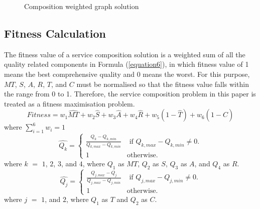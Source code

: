 \documentclass{llncs}
\begin{document}
\begin{figure}[h]
\centering
{}
 \caption{Composition weighted graph solution}
 \label{wscs}
\end{figure}

\vspace{-1cm}
\subsection{Fitness Calculation}
The fitness value of a service composition solution is a weighted sum of all the quality related components in Formula (\ref{equation6}), in which fitness value of 1 means the best comprehensive quality and 0 means the worst. For this purpose, $MT$, $S$, $A$, $R$, $T$, and $C$ must be normalised so that the fitness value falls within the range from 0 to 1. Therefore, the service composition problem in this paper is treated as a fitness maximisation problem.
\vspace{-0.2cm}
\begin{equation}
\label{equation6}
Fitness = w_1 \hat{MT} + w_2 \hat{S} + w_3 \hat{A} + w_4 \hat{R} + w_5(1 - \hat{T}) + w_6(1 - \hat{C})
\end{equation}
\noindent where $\sum_{i=1}^{6} w_i = 1$
\\
\vspace{-0.2cm}
\begin{equation}
\label{equation7}
\hat{Q_k} = 
\begin{cases}
	\frac{Q_k - Q_{k, min}}{Q_{k, max} - Q_{k, min}} & \text{ if }Q_{k, max} - Q_{k, min} \neq 0.\\
	1 & \mathrm{ otherwise}.
\end{cases}
\end{equation}
\noindent where $k$ $=$ $1$, $2$, $3$, and $4$, where $Q_1$ as $MT$, $Q_2$ as $S$, $Q_3$ as $A$, and $Q_4$ as $R$.
\begin{equation}
\label{equation8}
\hat{Q_j} = 
\begin{cases}
	\frac{Q_{j,max} - Q_j}{Q_{j, max} - Q_{j, min}} & \text{ if }Q_{j, max} - Q_{j, min} \neq 0.\\
	1 & \mathrm{ otherwise}.
\end{cases}
\end{equation}
\noindent where $j$ $=$ $1$, and $2$, where $Q_1$ as $T$ and $Q_2$ as $C$.
\end{document}
